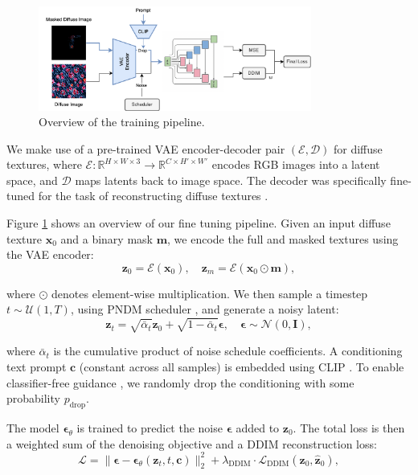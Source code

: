 \documentclass[11pt,twocolumn]{article}
\begin{document}
\begin{figure}[!t]
  \centering
  \includegraphics[width=0.8\textwidth]{figures/pbr_train_overview.png}
  \caption{Overview of the training pipeline.}
  \label{fig:trn-overview}
\end{figure}

We make use of a pre-trained VAE \cite{vae} encoder-decoder pair $(\mathcal{E}, \mathcal{D})$ for diffuse textures, where $\mathcal{E}: \mathbb{R}^{H \times W \times 3} \rightarrow \mathbb{R}^{C \times H' \times W'}$ encodes RGB images into a latent space, and $\mathcal{D}$ maps latents back to image space. The decoder was specifically fine-tuned for the task of reconstructing diffuse textures \cite{dresscode}.

Figure \ref{fig:trn-overview} shows an overview of our fine tuning pipeline. Given an input diffuse texture $\mathbf{x}_0$ and a binary mask $\mathbf{m}$, we encode the full and masked textures using the VAE encoder:
$$
\mathbf{z}_0 = \mathcal{E}(\mathbf{x}_0), \quad \mathbf{z}_m = \mathcal{E}(\mathbf{x}_0 \odot \mathbf{m}),
$$

where $\odot$ denotes element-wise multiplication. We then sample a timestep $t \sim \mathcal{U}(1, T)$, using PNDM scheduler \cite{pndm}, and generate a noisy latent:
\vspace{0.0em}
$$
\mathbf{z}_t = \sqrt{\bar{\alpha}_t} \mathbf{z}_0 + \sqrt{1 - \bar{\alpha}_t} \boldsymbol{\epsilon}, \quad \boldsymbol{\epsilon} \sim \mathcal{N}(0, \mathbf{I}),
$$

where $\bar{\alpha}_t$ is the cumulative product of noise schedule coefficients. A conditioning text prompt $\mathbf{c}$ (constant across all samples) is embedded using CLIP \cite{clip}. To enable classifier-free guidance \cite{cfg}, we randomly drop the conditioning with some probability $p_{\text{drop}}$.

The model $\boldsymbol{\epsilon}_\theta$ is trained to predict the noise $\boldsymbol{\epsilon}$ added to $\mathbf{z}_0$. The total loss is then a weighted sum of the denoising objective and a DDIM reconstruction loss:
$$
\mathcal{L} = \|\boldsymbol{\epsilon} - \boldsymbol{\epsilon}_\theta(\mathbf{z}_t, t, \mathbf{c})\|_2^2 + \lambda_{\text{DDIM}} \cdot \mathcal{L}_{\text{DDIM}}(\mathbf{z}_0, \hat{\mathbf{z}}_0),
$$
\end{document}
